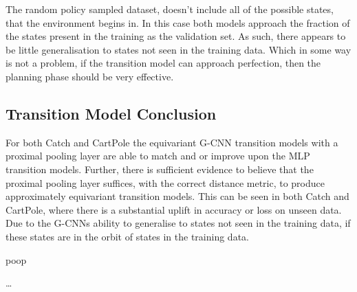 The random policy sampled dataset, doesn't include all of the possible states, that the environment begins in. In this case both models approach the fraction of the states present in the training as the validation set. As such, there appears to be little generalisation to states not seen in the training data. Which in some way is not a problem, if the transition model can approach perfection, then the planning phase should be very effective.

\subsection{Transition Model Conclusion}
For both Catch and CartPole the equivariant G-CNN transition models with a proximal pooling layer are able to match and or improve upon the MLP transition models. Further, there is sufficient evidence to believe that the proximal pooling layer suffices, with the correct distance metric, to produce approximately equivariant transition models. This can be seen in both Catch and CartPole, where there is a substantial uplift in accuracy or loss on unseen data. Due to the G-CNNs ability to generalise to states not seen in the training data, if these states are in the orbit of states in the training data. 

poop





\ldots


